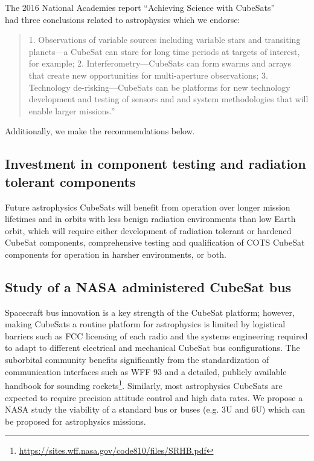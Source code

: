 \documentclass[12pt]{article}
\begin{document}
The 2016 National Academies report ``Achieving Science with CubeSats''\\ \cite{national_academies_of_sciences_achieving_2016}  had three conclusions related to astrophysics which we endorse: 
\begin{quote}
    
1. Observations of variable sources including variable stars and transiting planets—a CubeSat can stare for long time periods at targets of interest, for example; 2. Interferometry—CubeSats can form swarms and arrays that create new opportunities for multi-aperture observations; 3. Technology de-risking—CubeSats can be platforms for new technology development and testing of sensors and and system methodologies that will enable larger missions.''
\end{quote}



Additionally, we make the recommendations below.

\subsection{Investment in component testing and radiation tolerant components}
Future astrophysics CubeSats will benefit from operation over longer mission lifetimes and in orbits with less benign radiation environments than low Earth orbit, which will require either development of radiation tolerant or hardened CubeSat components, comprehensive testing and qualification of COTS CubeSat components for operation in harsher environments, or both. 

\subsection{Study of a NASA administered CubeSat bus}
Spacecraft bus innovation is a key strength of the CubeSat platform; however, making CubeSats a routine platform for astrophysics is limited by logistical barriers such as FCC licensing of each radio and the systems engineering required to adapt to different electrical and mechanical CubeSat bus configurations.  The suborbital community benefits significantly from the standardization of communication interfaces such as WFF 93 and a detailed, publicly available handbook for sounding rockets\footnote{\url{https://sites.wff.nasa.gov/code810/files/SRHB.pdf}}. 
Similarly, most astrophysics CubeSats are expected to require precision attitude control and high data rates.
We propose a NASA study the viability of a standard bus or buses (e.g. 3U and 6U) which can be proposed for astrophysics missions.
\end{document}

